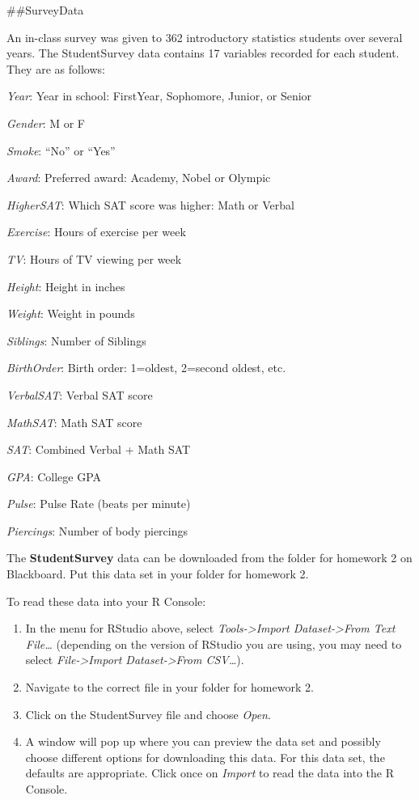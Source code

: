 \documentclass[]{article}
\begin{document}
\#\#SurveyData

An in-class survey was given to 362 introductory statistics students
over several years. The StudentSurvey data contains 17 variables
recorded for each student. They are as follows:

\emph{Year}: Year in school: FirstYear, Sophomore, Junior, or Senior

\emph{Gender}: M or F

\emph{Smoke}: ``No'' or ``Yes''

\emph{Award}: Preferred award: Academy, Nobel or Olympic

\emph{HigherSAT}: Which SAT score was higher: Math or Verbal

\emph{Exercise}: Hours of exercise per week

\emph{TV}: Hours of TV viewing per week

\emph{Height}: Height in inches

\emph{Weight}: Weight in pounds

\emph{Siblings}: Number of Siblings

\emph{BirthOrder}: Birth order: 1=oldest, 2=second oldest, etc.

\emph{VerbalSAT}: Verbal SAT score

\emph{MathSAT}: Math SAT score

\emph{SAT}: Combined Verbal + Math SAT

\emph{GPA}: College GPA

\emph{Pulse}: Pulse Rate (beats per minute)

\emph{Piercings}: Number of body piercings

The \textbf{StudentSurvey} data can be downloaded from the folder for
homework 2 on Blackboard. Put this data set in your folder for homework
2.

To read these data into your R Console:

\begin{enumerate}
\def\labelenumi{\roman{enumi}.}
\item
  In the menu for RStudio above, select \emph{Tools-\textgreater Import
  Dataset-\textgreater From Text File\ldots{}} (depending on the version
  of RStudio you are using, you may need to select
  \emph{File-\textgreater Import Dataset-\textgreater From
  CSV\ldots{}}).
\item
  Navigate to the correct file in your folder for homework 2.
\item
  Click on the StudentSurvey file and choose \emph{Open}.
\item
  A window will pop up where you can preview the data set and possibly
  choose different options for downloading this data. For this data set,
  the defaults are appropriate. Click once on \emph{Import} to read the
  data into the R Console.
\end{enumerate}
\end{document}
